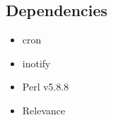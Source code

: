 

\subsection{Dependencies}

\begin{itemize}
    \item{cron}
    \item{inotify}
    \item{Perl v5.8.8}
    \item{Relevance}
\end{itemize}
